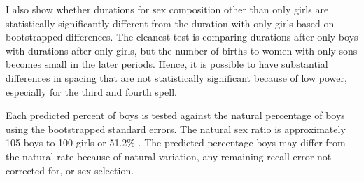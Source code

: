 \documentclass[12pt,letterpaper]{article}
\begin{document}
I also show whether durations for sex composition other than only girls are statistically 
significantly different from the duration with only girls based on bootstrapped 
differences. 
The cleanest test is comparing durations after only boys with durations after
only girls, but the number of births to women with only sons becomes small 
in the later periods.
Hence, it is possible to have substantial differences in spacing that are
not statistically significant because of low power, especially for the third 
and fourth spell.

Each predicted percent of boys is tested against the natural percentage of
boys using the bootstrapped standard errors.
The natural sex ratio is approximately 105 boys to 100 girls or
51.2\% \citep{ben-porath76b,jacobsen99,Portner2015b}.
The predicted percentage boys may differ from the natural rate because of 
natural variation, any remaining recall error not corrected for, or 
sex selection. 



















\clearpage
\end{document}
